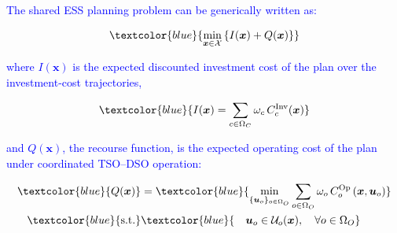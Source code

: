 
\textcolor{blue}{The shared ESS planning problem can be generically written as:}

\begin{equation}
    \textcolor{blue}{
        \min_{\boldsymbol{x}\in\mathcal{X}}
        \left\{
            I(\boldsymbol{x}) + Q(\boldsymbol{x})
        \right\}
    }
    \label{eq:two_stage_planning_problem}
\end{equation}

\noindent
\textcolor{blue}{where $I(\boldsymbol{x})$ is the expected discounted investment cost of the plan over the
investment-cost trajectories,}

\begin{equation}
    \textcolor{blue}{
        I(\boldsymbol{x}) = \sum_{c\in\Omega_C} \omega_c\, C_c^{\mathrm{Inv}}(\boldsymbol{x})
    }
    \label{eq:investment_cost_generic}
\end{equation}

\noindent
\textcolor{blue}{and $Q(\boldsymbol{x})$, the recourse function, is the expected operating cost of the plan under
coordinated TSO--DSO operation:}

\begin{subequations}
    \begin{align}
        \textcolor{blue}{Q(\boldsymbol{x})} &= \textcolor{blue}{\min_{\{\boldsymbol{u}_o\}_{o\in\Omega_O}} \sum_{o\in\Omega_O} \omega_o\, C_o^{\mathrm{Op}} \left(\boldsymbol{x}, \boldsymbol{u}_o \right)}\\
        \textcolor{blue}{\text{s.t.}} & \textcolor{blue}{\quad \boldsymbol{u}_o \in \mathcal{U}_o(\boldsymbol{x}), \quad \forall o\in\Omega_O}
    \end{align}
    \label{eq:operational_recourse_function}
\end{subequations}

